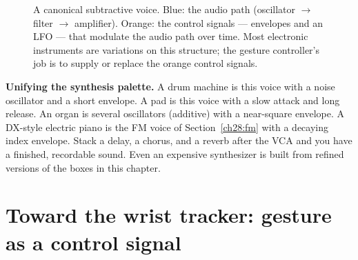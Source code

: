 \begin{figure}[H]
\centering
{}
\caption{A canonical subtractive voice. Blue: the audio path (oscillator
$\to$ filter $\to$ amplifier). Orange: the control signals --- envelopes and an
LFO --- that modulate the audio path over time. Most electronic instruments are
variations on this structure; the gesture controller's job is to supply or replace
the orange control signals.}
\label{ch28:fig-voice}
\end{figure}

\begin{applicationbox}
\textbf{Unifying the synthesis palette.} A drum machine is this voice with a noise
oscillator and a short envelope. A pad is this voice with a slow attack and
long release. An organ is several oscillators (additive) with a near-square
envelope. A DX-style electric piano is the FM voice of
Section~\ref{ch28:fm} with a decaying index envelope. Stack a delay, a chorus,
and a reverb after the VCA and you have a finished, recordable sound. Even an
expensive synthesizer is built from refined versions of the boxes in this
chapter.
\end{applicationbox}

\section{Toward the wrist tracker: gesture as a control signal}
\label{ch28:goal}

